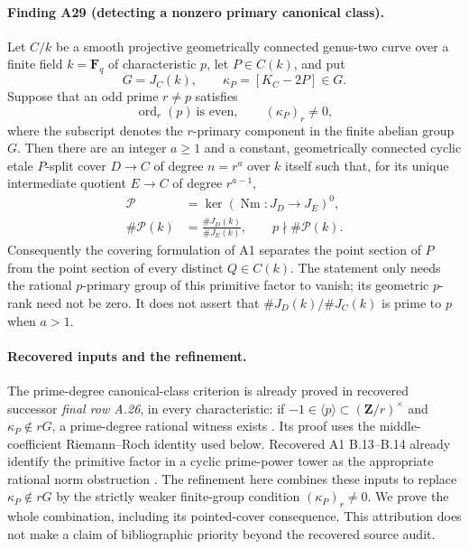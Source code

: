 \documentclass[11pt,a4paper]{article}
\begin{document}
\paragraph{Finding A29 (detecting a nonzero primary canonical class).}
Let $C/k$ be a smooth projective geometrically connected genus-two
curve over a finite field $k=\mathbf F_q$ of characteristic $p$, let
$P\in C(k)$, and put
\[
 G=J_C(k),\qquad \kappa_P=[K_C-2P]\in G.
 \tag{PC.1}
\]
Suppose that an odd prime $r\ne p$ satisfies
\[
 \operatorname{ord}_r(p)\ \text{is even},\qquad
 (\kappa_P)_r\ne0,
 \tag{PC.2}
\]
where the subscript denotes the $r$-primary component in the finite
abelian group $G$. Then there are an integer $a\ge1$ and a constant,
geometrically connected cyclic etale $P$-split cover
$D\to C$ of degree $n=r^a$ over $k$ itself such that, for its unique
intermediate quotient $E\to C$ of degree $r^{a-1}$,
\[
 \begin{aligned}
 \mathcal P&=\ker(\operatorname{Nm}:J_D\longrightarrow J_E)^0,\\
 \#\mathcal P(k)&=\frac{\#J_D(k)}{\#J_E(k)},
 \qquad p\nmid\#\mathcal P(k).
 \end{aligned}
 \tag{PC.3}
\]
Consequently the covering formulation of A1 separates the point
section of $P$ from the point section of every distinct $Q\in C(k)$.
The statement only needs the rational $p$-primary group of this
primitive factor to vanish; its geometric $p$-rank need not be zero.
It does not assert that $\#J_D(k)/\#J_C(k)$ is prime to $p$ when
$a>1$.

\paragraph{Recovered inputs and the refinement.}
The prime-degree canonical-class criterion is already proved in
recovered successor \emph{final row A.26}, in every characteristic:
if $-1\in\langle p\rangle\subset(\mathbf Z/r)^\times$ and
$\kappa_P\notin rG$, a prime-degree rational witness exists
\cite[A.26]{ASrun}. Its proof uses the middle-coefficient
Riemann--Roch identity used below. Recovered A1 B.13--B.14 already
identify the primitive factor in a cyclic prime-power tower as the
appropriate rational norm obstruction \cite[B.13--B.14]{A1run}.
The refinement here combines these inputs to replace
$\kappa_P\notin rG$ by the strictly weaker finite-group condition
$(\kappa_P)_r\ne0$. We prove the whole combination, including
its pointed-cover consequence. This attribution does not make a
claim of bibliographic priority beyond the recovered source audit.
\end{document}
